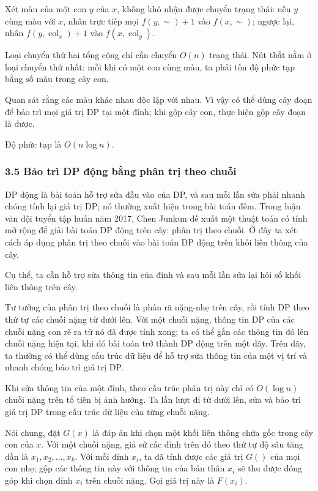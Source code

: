 \documentclass[11pt]{article}
\begin{document}
Xét màu của một con \(y\) của \(x\), không khó nhận được chuyển trạng thái: nếu
\(y\) cùng màu với \(x\), nhân trực tiếp mọi \(f(y,\sim)+1\) vào
\(f(x,\sim)\); ngược lại, nhân \(f(y,\operatorname{col}_x)+1\) vào
\(f(x,\operatorname{col}_y)\).

Loại chuyển thứ hai tổng cộng chỉ cần chuyển \(O(n)\) trạng thái. Nút thắt nằm ở
loại chuyển thứ nhất: mỗi khi có một con cùng màu, ta phải tốn độ phức tạp bằng
số màu trong cây con.

Quan sát rằng các màu khác nhau độc lập với nhau. Vì vậy có thể dùng cây đoạn để
bảo trì mọi giá trị DP tại một đỉnh; khi gộp cây con, thực hiện gộp cây đoạn là
được.

Độ phức tạp là \(O(n\log n)\).

\subsubsection*{3.5 Bảo trì DP động bằng phân trị theo chuỗi}

DP động là bài toán hỗ trợ sửa đầu vào của DP, và sau mỗi lần sửa phải nhanh
chóng tính lại giá trị DP; nó thường xuất hiện trong bài toán đếm. Trong luận
văn đội tuyển tập huấn năm 2017, Chen Junkun đề xuất một thuật toán có tính mở
rộng để giải bài toán DP động trên cây: phân trị theo chuỗi. Ở đây ta xét cách
áp dụng phân trị theo chuỗi vào bài toán DP động trên khối liên thông của cây.

Cụ thể, ta cần hỗ trợ sửa thông tin của đỉnh và sau mỗi lần sửa lại hỏi số khối
liên thông trên cây.

Tư tưởng của phân trị theo chuỗi là phân rã nặng-nhẹ trên cây, rồi tính DP theo
thứ tự các chuỗi nặng từ dưới lên. Với một chuỗi nặng, thông tin DP của các
chuỗi nặng con rẽ ra từ nó đã được tính xong; ta có thể gắn các thông tin đó
lên chuỗi nặng hiện tại, khi đó bài toán trở thành DP động trên một dãy. Trên
dãy, ta thường có thể dùng cấu trúc dữ liệu để hỗ trợ sửa thông tin của một vị
trí và nhanh chóng bảo trì giá trị DP.

Khi sửa thông tin của một đỉnh, theo cấu trúc phân trị này chỉ có \(O(\log n)\)
chuỗi nặng trên tổ tiên bị ảnh hưởng. Ta lần lượt đi từ dưới lên, sửa và bảo trì
giá trị DP trong cấu trúc dữ liệu của từng chuỗi nặng.

Nói chung, đặt \(G(x)\) là đáp án khi chọn một khối liên thông chứa gốc trong cây
con của \(x\). Với một chuỗi nặng, giả sử các đỉnh trên đó theo thứ tự độ sâu
tăng dần là \(x_1,x_2,\ldots,x_k\). Với mỗi đỉnh \(x_i\), ta đã tính được các
giá trị \(G()\) của mọi con nhẹ; gộp các thông tin này với thông tin của bản
thân \(x_i\) sẽ thu được đóng góp khi chọn đỉnh \(x_i\) trên chuỗi nặng. Gọi giá
trị này là \(F(x_i)\).
\end{document}
